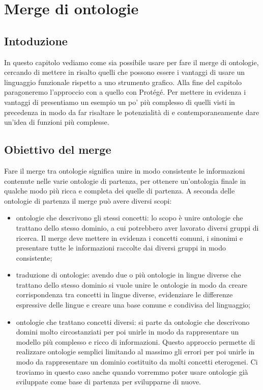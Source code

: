 \chapter{Merge di ontologie}
\label{ch4}
\section{Intoduzione}
In questo capitolo vediamo come sia possibile usare \cduce per fare il merge di ontologie, cercando di mettere in risalto quelli che possono essere i vantaggi di usare un linguaggio funzionale rispetto a uno strumento grafico. Alla fine del capitolo paragoneremo l'approccio con \cduce a quello con Protégé. Per mettere in evidenza i vantaggi di \cduce presentiamo un esempio un po' più complesso di quelli visti in precedenza in modo da far risaltare le potenzialità di \cduce e contemporaneamente dare un'idea di funzioni più complesse.

\section{Obiettivo del merge}\label{ch4.1}
Fare il merge tra ontologie significa unire in modo consistente le informazioni contenute nelle varie ontologie di partenza, per ottenere un'ontologia finale in qualche modo più ricca e completa dei quelle di partenza. A seconda delle ontologie di partenza il merge può avere diversi scopi:
\begin{itemize}
	\item ontologie che descrivono gli stessi concetti: lo scopo è unire ontologie che trattano dello stesso dominio, a cui potrebbero aver lavorato diversi gruppi di ricerca. Il merge deve mettere in evidenza i concetti comuni, i sinonimi e presentare tutte le informazioni raccolte dai diversi gruppi in modo consistente;
	\item traduzione di ontologie: avendo due o più ontologie in lingue diverse che trattano dello stesso dominio si vuole unire le ontologie in modo da creare corrispondenza tra concetti in lingue diverse, evidenziare le differenze espressive delle lingue e creare una base comune e condivisa del linguaggio;
	\item ontologie che trattano concetti diversi: si parte da ontologie che descrivono domini molto circostanziati per poi unirle in modo da rappresentare un modello più complesso e ricco di informazioni. Questo approccio permette di realizzare ontologie semplici limitando al massimo gli errori per poi unirle in modo da rappresentare un dominio costituito da molti concetti eterogenei. Ci troviamo in questo caso anche quando vorremmo poter usare ontologie già sviluppate come base di partenza per svilupparne di nuove.
\end{itemize}

